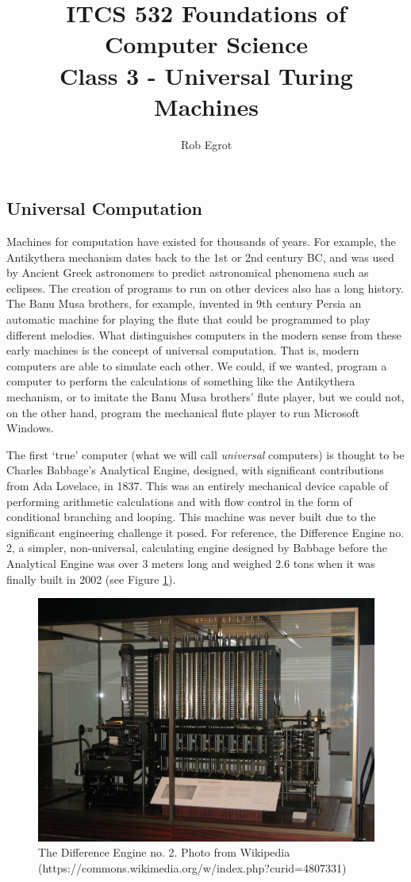\documentclass{article}
\title{ITCS 532 Foundations of Computer Science\\
Class 3 - Universal Turing Machines}
\author{Rob Egrot}
\date{}
\theoremstyle{plain}
\theoremstyle{definition}
\begin{document}
\maketitle

\subsection{Universal Computation}
Machines for computation have existed for thousands of years. For example, the Antikythera mechanism dates back to the 1st or 2nd century BC, and was used by Ancient Greek astronomers to predict astronomical phenomena such as eclipses. The creation of programs to run on other devices also has a long history. The Banu Musa brothers, for example, invented in 9th century Persia an automatic machine for playing the flute that could be programmed to play different melodies. What distinguishes computers in the modern sense from these early machines is the concept of universal computation. That is, modern computers are able to simulate each other. We could, if we wanted, program a computer to perform the calculations of something like the Antikythera mechanism, or to imitate the Banu Musa brothers' flute player, but we could not, on the other hand, program the mechanical flute player to run Microsoft Windows. 

The first `true' computer (what we will call \emph{universal} computers) is thought to be Charles Babbage's Analytical Engine, designed, with significant contributions from Ada Lovelace, in 1837. This was an entirely mechanical device capable of performing arithmetic calculations and with flow control in the form of conditional branching and looping. This machine was never built due to the significant engineering challenge it posed. For reference, the Difference Engine no. 2, a simpler, non-universal, calculating engine designed by Babbage before the Analytical Engine was over 3 meters long and weighed 2.6 tons when it was finally built in 2002 (see Figure \ref{DE2}). 


\begin{figure}[ht]
\centering
\includegraphics[scale = 0.22]{DE2.jpg}  
\caption{The Difference Engine no. 2. Photo from Wikipedia (https://commons.wikimedia.org/w/index.php?curid=4807331)}
\label{DE2}
\end{figure}
\end{document}
